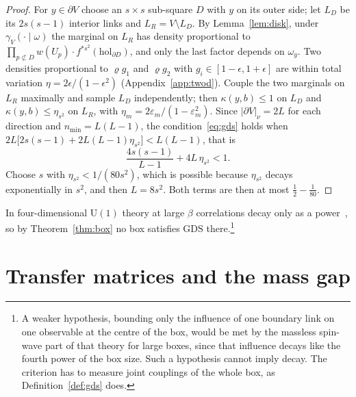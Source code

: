 \documentclass[aps,prd,twocolumn,superscriptaddress,nofootinbib,longbibliography,floatfix,amsmath,amssymb,10pt]{revtex4-2}
\theoremstyle{definition}
\theoremstyle{remark}
\newcommand{\U}{\mathrm{U}}
\begin{document}
\begin{proof}
For $y\in\partial V$ choose an $s\times s$ sub-square $D$ with $y$ on its
outer side; let $L_D$ be its $2s(s-1)$ interior links and $L_R=V\setminus
L_D$. By Lemma~\ref{lem:disk}, under $\gamma_V(\cdot\mid\omega)$ the marginal on
$L_R$ has density proportional to $\prod_{p\not\subset D}w(U_p)\cdot
f^{*s^2}(\mathrm{hol}_{\partial D})$, and only the last factor depends on
$\omega_y$. Two densities proportional to $\varrho g_1$ and $\varrho g_2$ with
$g_i\in[1-\epsilon,1+\epsilon]$ are within total variation
$\eta=2\epsilon/(1-\epsilon^2)$ (Appendix~\ref{app:twod}). Couple the two
marginals on $L_R$ maximally and sample $L_D$ independently; then
$\kappa(y,b)\le1$ on $L_D$ and $\kappa(y,b)\le\eta_{s^2}$ on $L_R$, with
$\eta_m=2\varepsilon_m/(1-\varepsilon_m^2)$. Since $|\partial V|_\nu=2L$ for
each direction and $n_{\min}=L(L-1)$, the condition~\eqref{eq:gds} holds when
$2L\bigl[2s(s-1)+2L(L-1)\eta_{s^2}\bigr]<L(L-1)$, that is
\[
\frac{4s(s-1)}{L-1}+4L\,\eta_{s^2}<1 .
\]
Choose $s$ with $\eta_{s^2}<1/(80s^2)$, which is possible because
$\eta_{s^2}$ decays exponentially in $s^2$, and then $L=8s^2$. Both terms are
then at most $\frac12-\frac1{80}$.
\end{proof}

In four-dimensional $\U(1)$ theory at large $\beta$ correlations decay only
as a power~\cite{Gut80,FS82}, so by Theorem~\ref{thm:box} no box satisfies
$\mathrm{GDS}$ there.\footnote{A weaker hypothesis, bounding only the
influence of one boundary link on one observable at the centre of the box,
would be met by the massless spin-wave part of that theory for large boxes,
since that influence decays like the fourth power of the box size. Such a
hypothesis cannot imply decay. The criterion has to measure joint couplings
of the whole box, as Definition~\ref{def:gds} does.}

\section{Transfer matrices and the mass gap}\label{sec:transfer}
\end{document}

